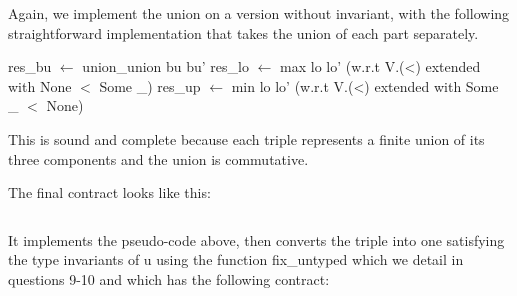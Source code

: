Again, we implement the union on a version without invariant, with the following
straightforward implementation that takes the union of each part separately.

  \begin{algorithmic}
     \State res\_bu $\gets$ union\_union bu bu'
     \State res\_lo $\gets$ max lo lo'  (w.r.t V.(<) extended with None $<$ Some \_)
     \State res\_up $\gets$ min lo lo' (w.r.t V.(<) extended with Some \_ $<$ None)
  \end{algorithmic}

This is sound and complete because each triple represents a finite union of its three
components and the union is commutative.

The final contract looks like this:
\inputminted{\whyml}{why3code/union_contract.mlw}
It implements the pseudo-code above, then converts the triple into one satisfying the
type invariants of u using the function fix\_untyped which we
detail in questions 9-10 and which has the following contract:
\inputminted{\whyml}{why3code/fix_untyped_contract.mlw}
